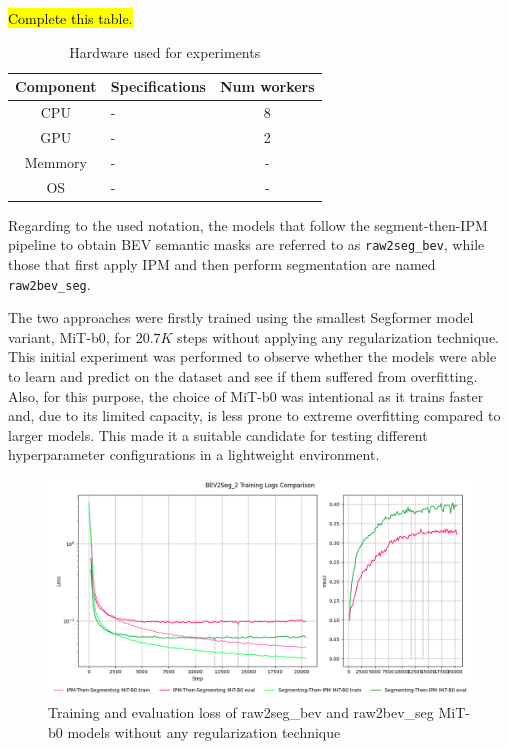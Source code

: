 \hl{Complete this table.}
\begin{table}[h]
    \centering
    \begin{tabular}{c l c}
        \toprule
        \textbf{Component} & \textbf{Specifications} & \textbf{Num workers} \\
        \midrule
        CPU         & - & 8 \\
        GPU         & - & 2 \\      
        Memmory     & - & - \\
        OS          & - & - \\
        \bottomrule
    \end{tabular}
    \caption{ Hardware used for experiments }
    \label{tab:hardware}
\end{table}

Regarding to the used notation, the models that follow the segment-then-IPM pipeline to obtain BEV semantic masks are referred to as \texttt{raw2seg\_bev}, while those that first apply IPM and then perform segmentation are named \texttt{raw2bev\_seg}.

The two approaches were firstly trained using the smallest Segformer model variant, MiT-b0, for $20.7K$ steps without applying any regularization technique. This initial experiment was performed to observe whether the models were able to learn and predict on the dataset and see if them suffered from overfitting. Also, for this purpose, the choice of MiT-b0 was intentional as it trains faster and, due to its limited capacity, is less prone to extreme overfitting compared to larger models. This made it a suitable candidate for testing different hyperparameter configurations in a lightweight environment.

\begin{figure}[h!]
    \centering
    \includegraphics[width=0.7\linewidth]{./images/experiments/overfitting_bev_nu.png}
    \caption{Training and evaluation loss of raw2seg\_bev and raw2bev\_seg MiT-b0 models without any regularization technique}
    \label{fig:overfitting_mit-b0}
\end{figure}


